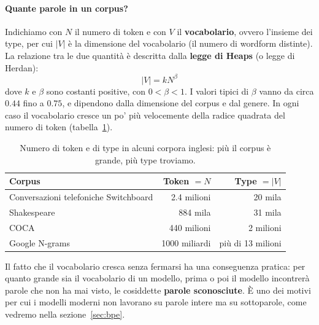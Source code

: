 \paragraph{Quante parole in un corpus?} Indichiamo con $N$ il numero di token e con $V$ il \textbf{vocabolario}, ovvero l'insieme dei type, per cui $|V|$ è la dimensione del vocabolario (il numero di wordform distinte). La relazione tra le due quantità è descritta dalla \textbf{legge di Heaps} (o legge di Herdan):
\begin{equation}
|V| = k N^\beta
\end{equation}
dove $k$ e $\beta$ sono costanti positive, con $0 < \beta < 1$. I valori tipici di $\beta$ vanno da circa $0.44$ fino a $0.75$, e dipendono dalla dimensione del corpus e dal genere. In ogni caso il vocabolario cresce un po' più velocemente della radice quadrata del numero di token (tabella~\ref{tab:corpora}).

\begin{table}[htbp]
\centering
\begin{tabular}{lrr}
\toprule
Corpus & Token $= N$ & Type $= |V|$ \\
\midrule
Conversazioni telefoniche Switchboard & 2.4 milioni & 20 mila \\
Shakespeare & 884 mila & 31 mila \\
COCA & 440 milioni & 2 milioni \\
Google N-grams & 1000 miliardi & più di 13 milioni \\
\bottomrule
\end{tabular}
\caption{Numero di token e di type in alcuni corpora inglesi: più il corpus è grande, più type troviamo.}
\label{tab:corpora}
\end{table}

Il fatto che il vocabolario cresca senza fermarsi ha una conseguenza pratica: per quanto grande sia il vocabolario di un modello, prima o poi il modello incontrerà parole che non ha mai visto, le cosiddette \textbf{parole sconosciute}. È uno dei motivi per cui i modelli moderni non lavorano su parole intere ma su sottoparole, come vedremo nella sezione~\ref{sec:bpe}.

